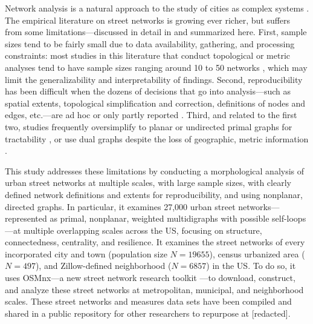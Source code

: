 \documentclass[Afour,sageh,times]{sagej}
\renewcommand{\cite}{\citep}
\begin{document}
Network analysis is a natural approach to the study of cities as complex systems \cite{masucci_random_2009}. The empirical literature on street networks is growing ever richer, but suffers from some limitations---discussed in detail in \cite{redacted_osmnx:_2017} and summarized here. First, sample sizes tend to be fairly small due to data availability, gathering, and processing constraints: most studies in this literature that conduct topological or metric analyses tend to have sample sizes ranging around 10 to 50 networks \cite{buhl_topological_2006, cardillo_structural_2006, barthelemy_modeling_2008, strano_urban_2013}, which may limit the generalizability and interpretability of findings. Second, reproducibility has been difficult when the dozens of decisions that go into analysis---such as spatial extents, topological simplification and correction, definitions of nodes and edges, etc.---are ad hoc or only partly reported \citep[e.g.,][]{porta_network_2006, strano_urban_2013}. Third, and related to the first two, studies frequently oversimplify to planar or undirected primal graphs for tractability \cite[e.g.,][]{buhl_topological_2006, cardillo_structural_2006, barthelemy_modeling_2008, masucci_random_2009}, or use dual graphs despite the loss of geographic, metric information \cite{batty_network_2005, jiang_integration_2002, ratti_space_2004, crucitti_centrality_2006, crucitti_centrality_2006-1}. 

This study addresses these limitations by conducting a morphological analysis of urban street networks at multiple scales, with large sample sizes, with clearly defined network definitions and extents for reproducibility, and using nonplanar, directed graphs. In particular, it examines 27,000 urban street networks---represented as primal, nonplanar, weighted multidigraphs with possible self-loops---at multiple overlapping scales across the US, focusing on structure, connectedness, centrality, and resilience. It examines the street networks of every incorporated city and town (population size $N=19655$), census urbanized area ($N=497$), and Zillow-defined neighborhood ($N=6857$) in the US. To do so, it uses OSMnx---a new street network research toolkit \cite{redacted_osmnx:_2017}---to download, construct, and analyze these street networks at metropolitan, municipal, and neighborhood scales. These street networks and measures data sets have been compiled and shared in a public repository for other researchers to repurpose at [redacted].
\end{document}

